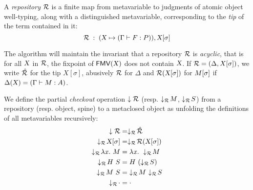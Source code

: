\documentclass{llncs}
\begin{document}


\begin{definition}
  A \emph{repository} $\mathcal{R}$ is a finite map from metavariable to
  judgments of atomic object well-typing, along with a distinguished
  metavariable, corresponding to the \emph{tip} of the term contained
  in it:
$$ \mathcal{R}\;:\;(\text{\textsl{X}} \mapsto (\Gamma\vdash{F}:{P})), {\text{\textsl{X}}}[{\sigma}] $$
\end{definition}

The algorithm will maintain the invariant that a repository $\mathcal{R}$ is
\emph{acyclic}, that is for all $\text{\textsl{X}}$ in $\mathcal{R}$, the fixpoint of
${\text{\textsf{FMV}}}({\text{\textsl{X}}})$ does not contain $\text{\textsl{X}}$. If $\mathcal{R} = (\Delta,
X[\sigma])$, we write $\hat {\mathcal{R}}$ for the tip $X[\sigma]$, abusively
$\mathcal{R}$ for $\Delta$ and $\mathcal{R} ({\text{\textsl{X}}}[{\sigma}])$ for ${M}[{\sigma}]$
if $\Delta(\text{\textsl{X}}) = (\Gamma\vdash M : A)$.

\begin{definition}
  We define the partial \emph{checkout} operation $\downarrow{\mathcal{R}}$
  (resp. $\downarrow_{\mathcal{R}}\!{M}$, $\downarrow_{\mathcal{R}}\!{S}$) from a repository
  (resp. object, spine) to a metaclosed object as unfolding the
  definitions of all metavariables recursively:
  \begin{align*}
    \checkout{\mr} &= \checkoutr{\hat{\mr}} \\
    \checkoutr{\smeta X \sigma} &= \checkoutr{\mr(\smeta X\sigma)}\\
    \checkoutr{\lam x M} &= \lam x \checkoutr{M} \\
    \checkoutr{\app H S} &= \app H {(\checkoutr{S})} \\
    \checkoutr{\spinecons M S} &= \spinecons {\checkoutr M} {\checkoutr S} \\
    \checkoutr{\spinenil} &= \spinenil
  \end{align*}
\end{definition}
\end{document}
